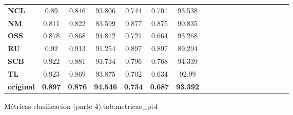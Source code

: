 {{\begin{tabular}{l|cccccccccccccccccc}
\textbf{NCL} & \cellcolor[rgb]{ .937,  .953,  .98}0.89 & \cellcolor[rgb]{ .945,  .957,  .984}0.846 & \cellcolor[rgb]{ .984,  .761,  .769}93.806 & \cellcolor[rgb]{ .886,  .918,  .965}0.744 & \cellcolor[rgb]{ .929,  .945,  .976}0.701 & \cellcolor[rgb]{ .976,  .545,  .553}93.538 &       &       &       &       &       &       &       &       &       &       &       &  \\
\textbf{NM} & \cellcolor[rgb]{ .702,  .784,  .898}0.811 & \cellcolor[rgb]{ .902,  .925,  .969}0.822 & \cellcolor[rgb]{ .847,  .886,  .949}83.599 & \cellcolor[rgb]{ .98,  .557,  .569}0.877 & \cellcolor[rgb]{ .976,  .533,  .541}0.875 & \cellcolor[rgb]{ .988,  .988,  1}90.835 &       &       &       &       &       &       &       &       &       &       &       &  \\
\textbf{OSS} & \cellcolor[rgb]{ .902,  .925,  .969}0.878 & \cellcolor[rgb]{ .984,  .984,  .996}0.868 & \cellcolor[rgb]{ .976,  .455,  .463}94.812 & \cellcolor[rgb]{ .82,  .871,  .941}0.721 & \cellcolor[rgb]{ .878,  .91,  .961}0.664 & \cellcolor[rgb]{ .98,  .588,  .6}93.268 &       &       &       &       &       &       &       &       &       &       &       &  \\
\textbf{RU} & \cellcolor[rgb]{ .98,  .624,  .631}0.92 & \cellcolor[rgb]{ .976,  .545,  .553}0.913 & \cellcolor[rgb]{ .961,  .969,  .988}91.254 & \cellcolor[rgb]{ .976,  .471,  .478}0.897 & \cellcolor[rgb]{ .976,  .455,  .463}0.897 & \cellcolor[rgb]{ .969,  .976,  .992}89.294 &       &       &       &       &       &       &       &       &       &       &       &  \\
\textbf{SCB} & \cellcolor[rgb]{ .98,  .573,  .58}0.922 & \cellcolor[rgb]{ .988,  .871,  .878}0.881 & \cellcolor[rgb]{ .984,  .78,  .792}93.734 & \cellcolor[rgb]{ .988,  .91,  .922}0.796 & \cellcolor[rgb]{ .988,  .91,  .922}0.768 & \cellcolor[rgb]{ .973,  .412,  .42}94.339 &       &       &       &       &       &       &       &       &       &       &       &  \\
\textbf{TL} & \cellcolor[rgb]{ .976,  .545,  .553}0.923 & \cellcolor[rgb]{ .988,  .988,  1}0.869 & \cellcolor[rgb]{ .984,  .737,  .749}93.875 & \cellcolor[rgb]{ .765,  .831,  .922}0.702 & \cellcolor[rgb]{ .839,  .882,  .945}0.634 & \cellcolor[rgb]{ .98,  .635,  .643}92.99 &       &       &       &       &       &       &       &       &       &       &       &  \\
\cmidrule{1-7}    \textbf{original} & \textbf{0.897} & \textbf{0.876} & \textbf{94.546} & \textbf{0.734} & \textbf{0.687} & \textbf{93.392} &       &       &       &       &       &       &       &       &       &       &       &  \\
\end{tabular}}}{Métricas clasificacion (parte 4).}{tab:metricas_pt4}

